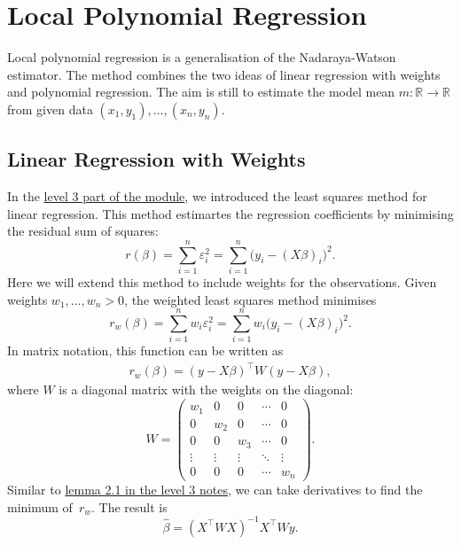 \documentclass[
  a4paper,
]{article}
\theoremstyle{definition}
\theoremstyle{definition}
\theoremstyle{definition}
\theoremstyle{definition}
\theoremstyle{remark}
\begin{document}
\clearpage

\section{Local Polynomial Regression}\label{X06-locpoly}

Local polynomial regression is a generalisation of the
Nadaraya-Watson estimator. The method combines the two ideas of
linear regression with weights and polynomial regression. The aim
is still to estimate the model mean \(m \colon\mathbb{R}\to \mathbb{R}\) from
given data \((x_1, y_1), \ldots, (x_n, y_n)\).

\subsection{Linear Regression with Weights}\label{linear-regression-with-weights}

In the \href{https://seehuhn.github.io/MATH3714/S02-multiple.html\#the-normal-equations}{level 3 part of the module},
we introduced the least squares method for linear regression. This method
estimartes the regression coefficients by minimising the residual sum of
squares:
\begin{equation*}
  r(\beta)
  = \sum_{i=1}^n \varepsilon_i^2
  = \sum_{i=1}^n \bigl( y_i - (X\beta)_i \bigr)^2.
\end{equation*}
Here we will extend this method to include weights for the observations.
Given weights
\(w_1, \ldots, w_n > 0\), the weighted least squares method minimises
\begin{equation*}
  r_w(\beta)
  = \sum_{i=1}^n w_i \varepsilon_i^2
  = \sum_{i=1}^n w_i \bigl( y_i - (X\beta)_i \bigr)^2.
\end{equation*}
In matrix notation, this function can be written as
\begin{align*}
  r_w(\beta)
  = (y - X \beta)^\top W (y - X \beta),
\end{align*}
where \(W\) is a diagonal matrix with the weights on the diagonal:
\begin{equation}
  W
  = \begin{pmatrix}
      w_1 & 0 & 0 & \cdots & 0 \\
      0 & w_2 & 0 & \cdots & 0 \\
      0 & 0 & w_3 & \cdots & 0 \\
      \vdots & \vdots & \vdots & \ddots & \vdots \\
      0 & 0 & 0 & \cdots & w_n
    \end{pmatrix}.  \label{eq:W-diagonal}
\end{equation}
Similar to \href{https://seehuhn.github.io/MATH3714/S02-multiple.html\#lem:multiple-LSQ}{lemma 2.1 in the level 3 notes},
we can take derivatives to find
the minimum of~\(r_w\). The result is
\begin{equation*}
  \hat\beta
  = (X^\top W X)^{-1} X^\top W y.
\end{equation*}
\end{document}
